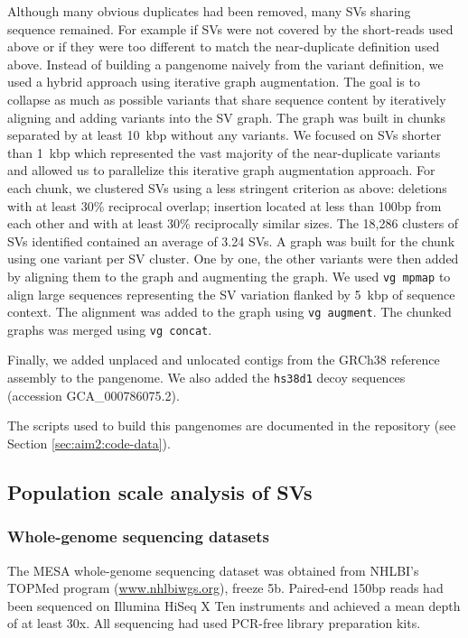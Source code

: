 \documentclass[11pt]{ucscthesis}
\begin{document}
Although many obvious duplicates had been removed, many SVs sharing sequence remained.
For example if SVs were not covered by the short-reads used above or if they were too different to match the near-duplicate definition used above.
Instead of building a pangenome naively from the variant definition, we used a hybrid approach using iterative graph augmentation.
The goal is to collapse as much as possible variants that share sequence content by iteratively aligning and adding variants into the SV graph.
The graph was built in chunks separated by at least 10~kbp without any variants.
We focused on SVs shorter than 1~kbp which represented the vast majority of the near-duplicate variants and allowed us to parallelize this iterative graph augmentation approach.
For each chunk, we clustered SVs using a less stringent criterion as above: deletions with at least 30\% reciprocal overlap; insertion located at less than 100bp from each other and with at least 30\% reciprocally similar sizes.
The 18,286 clusters of SVs identified contained an average of 3.24 SVs.
A graph was built for the chunk using one variant per SV cluster.
One by one, the other variants were then added by aligning them to the graph and augmenting the graph.
We used \texttt{vg~mpmap} \cite{sibbesen2021haplotype} to align large sequences representing the SV variation flanked by 5~kbp of sequence context.
The alignment was added to the graph using \texttt{vg~augment}.
The chunked graphs was merged using \texttt{vg~concat}.

Finally, we added unplaced and unlocated contigs from the GRCh38 reference assembly to the pangenome.
We also added the \texttt{hs38d1} decoy sequences (accession GCA\_000786075.2).

The scripts used to build this pangenomes are documented in the repository (see Section \ref{sec:aim2:code-data}).

\subsection{Population scale analysis of SVs}

\subsubsection{Whole-genome sequencing datasets}

The MESA whole-genome sequencing dataset was obtained from NHLBI’s TOPMed program (\url{www.nhlbiwgs.org}), freeze 5b.
Paired-end 150bp reads had been sequenced on Illumina HiSeq X Ten instruments and achieved a mean depth of at least 30x.
All sequencing had used PCR-free library preparation kits.
\end{document}
